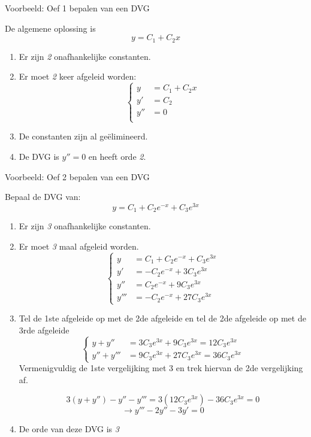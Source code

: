 \documentclass[12pt]{report}
\newcommand{\example}[2]{
      \hrulefill
      
      Voorbeeld: #1
      
      #2
      
      \hrulefill
}
\begin{document}
\example{Oef 1 bepalen van een DVG}
{
  De algemene oplossing is $$y = C_1 + C_2x$$
  \begin{enumerate}
   \item Er zijn \textit{2} onafhankelijke constanten.
   \item Er moet \textit{2} keer afgeleid worden:
   $$
      \begin{cases}
	y    & = C_1 + C_2x \\
	y'   & = C_2 \\
	y''  & = 0 \\
      \end{cases}
   $$
   \item De constanten zijn al geëlimineerd. 
   \item De DVG is $y'' = 0$ en heeft orde \textit{2}.

  \end{enumerate}
}

\example{Oef 2 bepalen van een DVG}
{
  Bepaal de DVG van: $$y = C_1 + C_2e^{-x} + C_3e^{3x}$$
  \begin{enumerate}
   \item Er zijn \textit{3} onafhankelijke constanten.
   \item Er moet \textit{3} maal afgeleid worden.
    \[ 
      \begin{cases}
			y & = C_1 + C_2e^{-x} + C_3e^{3x} \\
	y'     & = -C_2e^{-x} + 3C_3e^{3x}     \\
	y'' & = C_2e^{-x} + 9C_3e^{3x}      \\
	y''' & = -C_2e^{-x} + 27C_3e^{3x}
      \end{cases}
    \]

  \item 
  Tel de 1ste afgeleide op met de 2de afgeleide en tel de 2de afgeleide op met de 3rde afgeleide
  \[
    \begin{cases}
      y + y''    & = 3C_3e^{3x} + 9C_3e^{3x} = 12C_3e^{3x}  \\
      y'' + y''' & = 9C_3e^{3x} + 27C_3e^{3x} = 36C_3e^{3x}
    \end{cases}
  \]
  Vermenigvuldig de 1ste vergelijking met 3 en trek hiervan de 2de vergelijking af.
  
  $$3(y + y'') - y'' - y''' = 3(12C_3e^{3x}) - 36C_3e^{3x} = 0$$
  $$\rightarrow y''' - 2y'' - 3y' = 0$$
  \item
  De orde van deze DVG is \textit{3}
   
  \end{enumerate}
}
\end{document}
